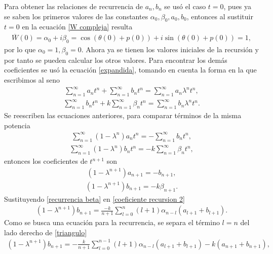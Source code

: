 Para obtener las relaciones de recurrencia de $a_{n},b_{n}$ se usó el caso $t=0$, pues ya se saben los primeros valores de las constantes $\alpha_{0}, \beta_{0}, a_{0}, b_{0}$, entonces al sustituir $t=0$ en la ecuación \eqref{W compleja} resulta
\begin{eqnarray}
\overline{W}(0)=\alpha_{0}+i\beta_{0}=\cos(\theta(0)+p(0))+i\sin(\theta(0)+p(0))=1,
\end{eqnarray}
por lo que $\alpha_{0}=1,\beta_{0}=0$. Ahora ya se tienen los valores iniciales de la recursión y por tanto se pueden calcular los otros valores. Para encontrar los demás coeficientes se usó la ecuación \eqref{expandida}, tomando en cuenta la forma en la que escribimos al seno
\begin{eqnarray}
\sum_{n=1}^{\infty}a_{n}t^{n}+\sum_{n=1}^{\infty}b_{n}t^{n}=\sum_{n=1}^{\infty}a_{n}\lambda^{n}t^{n},
\end{eqnarray}
\begin{eqnarray}
\sum_{n=1}^{\infty}b_{n}t^{n}+k\sum_{n=1}^{\infty}\beta_{n}t^{n}=\sum_{n=1}^{\infty}b_{n}
\lambda^{n}t^{n}.
\end{eqnarray}
Se reescriben las ecuaciones anteriores, para comparar términos de la misma potencia
\begin{eqnarray}
\sum_{n=1}^{\infty}(1-\lambda^{n})a_{n}t^{n}=-\sum_{n=1}^{\infty}b_{n}t^{n},
\end{eqnarray}
\begin{eqnarray}
\sum_{n=1}^{\infty}(1-\lambda^{n})b_{n}t^{n}=-k\sum_{n=1}^{\infty}\beta_{n}t^{n},
\end{eqnarray}
entonces los coeficientes de $t^{n+1}$ son
\begin{eqnarray}
(1-\lambda^{n+1})a_{n+1}=-b_{n+1},
\label{coeficiente recursion 1}
\end{eqnarray}
\begin{eqnarray}
(1-\lambda^{n+1})b_{n+1}=-k\beta_{n+1}.
\label{coeficiente recursion 2}
\end{eqnarray}
Sustituyendo \eqref{recurrencia beta} en  \eqref{coeficiente recursion 2}
\begin{eqnarray}
(1-\lambda^{n+1})b_{n+1}=\frac{-k}{n+1}\sum_{l=0}^{n}(l+1)\alpha_{n-l}(a_{l+1}+b_{l+1}).
\label{triangulo}
\end{eqnarray}
Como se busca una ecuación para la recurrencia, se separa el término $l=n$ del lado derecho de \eqref{triangulo}
\begin{eqnarray}
(1-\lambda^{n+1})b_{n+1}=-\frac{k}{n+1}\sum_{l=0}^{n-1}(l+1)\alpha_{n-l}(a_{l+1}+b_{l+1})-k(a_{n+1}+b_{n+1}),
\label{triangulo1}
\end{eqnarray}
